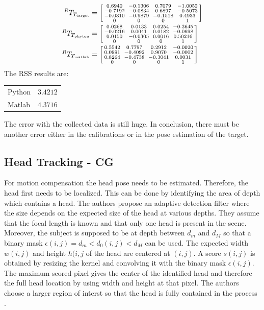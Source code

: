 \documentclass[conference]{IEEEtran}
\begin{document}
\begin{align*}
^RT_{T_{\text{target}}} &= \begin{bsmallmatrix}0.6940 && -0.1306 && 0.7079 &&	-1.0052 \\
-0.7192 &&	-0.0834 && 	0.6897 && 	-0.5073 \\
-0.0310 && 	-0.9879 &&  -0.1518 && 	0.4933 \\
0 && 0 && 	0	&& 1\end{bsmallmatrix} \\
^RT_{T_{\text{phyton}}} &= 
    \begin{bsmallmatrix}
    0.0268 &&	0.0133 &&	0.0254 &&	-0.3645 \\
    -0.0216 &&	0.0041 &&	0.0182 &&    -0.0698 \\
    0.0150 &&   -0.0305 &&    0.0016 &&	0.50216 \\
    0 &&	0 && 0 && 1
     \end{bsmallmatrix}\\
^RT_{T_{\text{matlab}}} &= 
    \begin{bsmallmatrix}
    0.5542 &&	0.7797 &&	0.2912 &&	-0.0020 \\
    0.0991 &&   -0.4092 &&	0.9070 &&	-0.0002 \\
    0.8264 &&   -0.4738 &&	-0.3041 &&	0.0031 \\
    0 &&	0 &&	0 &&	1
     \end{bsmallmatrix}             
\end{align*}
The RSS results are:
\begin{center}
\begin{tabular}{l|r}
Python & \(3.4212\) \\
Matlab & \(4.3716\)
\end{tabular}
\end{center}
The error with the collected data is still huge. In conclusion, there must be another error either in the calibrations or in the pose estimation of the target.  

\subsection{Head Tracking - CG}
For motion compensation the head pose needs to be estimated. Therefore, the head first needs to be localized. This can be done by identifying the area of depth which contains a head. The authors \cite{headtracking} propose an adaptive detection filter where the size depends on the expected size of the head at various depths. They assume that the focal length is known and that only one head is present in the scene. Moreover, the subject is supposed to be at depth between $d_m$ and $d_M$ so that a binary mask $\epsilon (i,j)=d_m<d_0(i,j)<d_M$ can be used. The expected width $w(i,j)$ and height $h(i,j$ of the head are centered at $(i,j)$. A score $s(i,j)$ is obtained by resizing the kernel and convolving it with the binary mask $\epsilon(i,j)$. The maximum scored pixel gives the center of the identified head and therefore the full head location by using width and height at that pixel. The authors choose a larger region of interst so that the head is fully contained in the process \cite{headtracking}.
\end{document}
